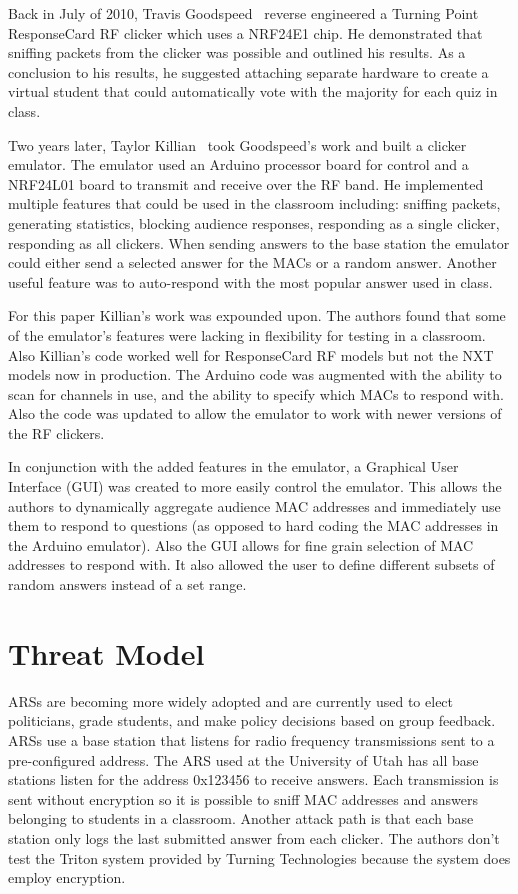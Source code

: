 Back in July of 2010, Travis Goodspeed~\cite{travis} reverse engineered a Turning Point ResponseCard RF clicker which uses a NRF24E1 chip.  He demonstrated that sniffing packets from the clicker was possible and outlined his results.  As a conclusion to his results, he suggested attaching separate hardware to create a virtual student that could automatically vote with the majority for each quiz in class.

Two years later, Taylor Killian~\cite{taylor} took Goodspeed’s work and built a clicker emulator.  The emulator used an Arduino processor board for control and a NRF24L01 board to transmit and receive over the RF band. He implemented multiple features that could be used in the classroom including: sniffing packets, generating statistics, blocking audience responses, responding as a single clicker, responding as all clickers.  When sending answers to the base station the emulator could either send a selected answer for the MACs or a random answer.  Another useful feature was to auto-respond with the most popular answer used in class.

For this paper Killian’s work was expounded upon. The authors found that some of the emulator’s features were lacking in flexibility for testing in a classroom.  Also Killian's code worked well for ResponseCard RF models but not the NXT models now in production. The Arduino code was augmented with the ability to scan for channels in use, and the ability to specify which MACs to respond with.  Also the code was updated to allow the emulator to work with newer versions of the RF clickers.

In conjunction with the added features in the emulator, a Graphical User Interface (GUI) was created to more easily control the emulator. This allows the authors to dynamically aggregate audience MAC addresses and immediately use them to respond to questions (as opposed to hard coding the MAC addresses in the Arduino emulator).  Also the GUI allows for fine grain selection of MAC addresses to respond with.  It also allowed the user to define different subsets of random answers instead of a set range.


\section{Threat Model}
ARSs are becoming more widely adopted and are currently used to elect politicians, grade students, and make policy decisions based on group feedback.  ARSs use a base station that listens for radio frequency transmissions sent to a pre-configured address.  The ARS used at the University of Utah has all base stations listen for the address 0x123456 to receive answers.  Each transmission is sent without encryption so it is possible to sniff MAC addresses and answers belonging to students in a classroom.  Another attack path is that each base station only logs the last submitted answer from each clicker.  The authors don't test the Triton system provided by Turning Technologies because the system does employ encryption.

